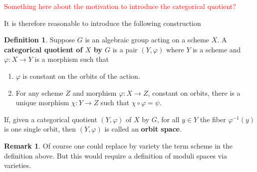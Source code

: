 \documentclass[12pt]{article}
\theoremstyle{remark}
\theoremstyle{definition}
\newtheorem{remark}{Remark}[section]
\newtheorem{definition}{Definition}[section]
\begin{document}
    \textcolor{red}{Something here about the motivation to introduce the categorical quotient?}
    
    It is therefore reasonable to introduce the following construction
    \begin{definition}
        Suppose $G$ is an algebraic group acting on a scheme $X$. A \textbf{categorical quotient of $X$ by $G$} is a pair $(Y, \varphi)$ where $Y$ is a scheme and $\varphi:X\to Y$ is a morphism such that
        \begin{enumerate}[\normalfont(i)]
            \item $\varphi$ is constant on the orbits of the action.
            \item For any scheme $Z$ and morphism $\varphi:X\to Z$, constant on orbits, there is a unique morphism $\chi:Y\to Z$ such that $\chi\circ\varphi=\psi$.
        \end{enumerate}

        If, given a categorical quotient $(Y,\varphi)$ of $X$ by $G$, for all $y\in Y$ the fiber $\varphi^{-1}(y)$ is one single orbit, then $(Y,\varphi)$ is called an \textbf{orbit space}.
    \end{definition}
    \begin{remark}
        Of course one could replace by variety the term scheme in the definition above. But this would require a definition of moduli spaces via varieties.
    \end{remark}
\end{document}
